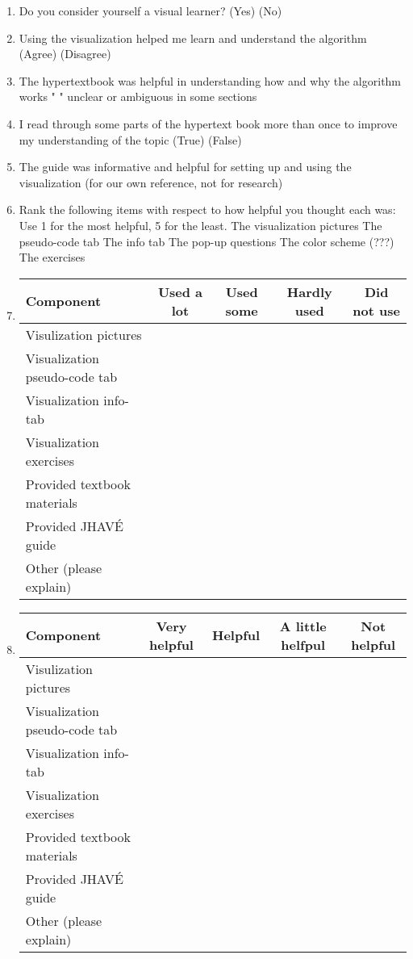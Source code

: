 \documentclass{article}
\begin{document}
\begin{enumerate}

\item Do you consider yourself a visual learner?  (Yes) (No)

\item Using the visualization helped me learn and understand the algorithm (Agree) (Disagree)

\item The hypertextbook was helpful in understanding how and why the algorithm works
"                   " unclear or ambiguous in some sections

\item I read through some parts of the hypertext book more than once to improve my understanding of the topic (True) (False)

\item The guide was informative and helpful for setting up and using the visualization (for our own reference, not for research) %

\item Rank the following items with respect to how helpful you thought each was:
Use 1 for the most helpful, 5 for the least.
  The visualization pictures
  The pseudo-code tab
  The info tab
  The pop-up questions
  The color scheme (???)
  The exercises

\item
\begin{tabular}{| l | c | c | c | c |}
\hline
\textbf{Component} & \textbf{Used a lot} & \textbf{Used some} & \textbf{Hardly used} & \textbf{Did not use} \\
\hline
Visulization pictures &&&& \\
\hline
Visualization pseudo-code tab &&&& \\
\hline
Visualization info-tab &&&& \\
\hline
Visualization exercises &&&& \\
\hline
Provided textbook materials &&&& \\
\hline
Provided JHAVÉ guide &&&& \\
\hline
Other (please explain) &&&& \\
\hline
\end{tabular}

\item
\begin{tabular}{| l | c | c | c | c |}
\hline
\textbf{Component} & \textbf{Very helpful} & \textbf{Helpful} & \textbf{A little helfpul} & \textbf{Not helpful} \\
\hline
Visulization pictures &&&& \\
\hline
Visualization pseudo-code tab &&&& \\
\hline
Visualization info-tab &&&& \\
\hline
Visualization exercises &&&& \\
\hline
Provided textbook materials &&&& \\
\hline
Provided JHAVÉ guide &&&& \\
\hline
Other (please explain) &&&& \\
\hline
\end{tabular}


\end{enumerate}
\end{document}
